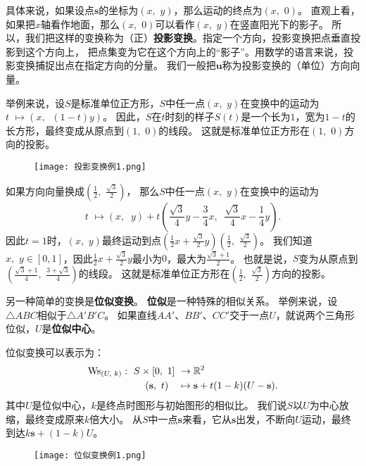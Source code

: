 \documentclass[12pt,UTF8]{ctexbook}
\begin{document}
具体来说，如果设点$\mathbf{s}$的坐标为$(x,\,\,y)$，那么运动的终点为$(x,\,\,0)$。
直观上看，如果把$x$轴看作地面，那么$(x,\,\,0)$可以看作$(x,\,\,y)$在竖直阳光下的影子。
所以，我们把这样的变换称为（正）\textbf{投影变换}。指定一个方向，投影变换把点垂直投影到这个方向上，
把点集变为它在这个方向上的“影子”。用数学的语言来说，投影变换捕捉出点在指定方向的分量。
我们一般把$\mathbf{u}$称为投影变换的（单位）方向向量。

举例来说，设$S$是标准单位正方形，$S$中任一点$(x,\,\,y)$在变换中的运动为$t\,\,\mapsto (x,\,\,\ (1 - t)y)$。
因此，$S$在$t$时刻的样子$S(t)$是一个长为$1$，宽为$1 - t$的长方形，最终变成从原点到$(1,\,\,0)$的线段。
这就是标准单位正方形在$(1,\,\,0)$方向的投影。

\begin{figure}[h] %
    \vspace{4pt}
    \centering
    \texttt{[image: 投影变换例1.png]}
\end{figure}

如果方向向量换成$(\frac{1}{2},\,\,\frac{\sqrt{3}}{2})$，
那么$S$中任一点$(x,\,\,y)$在变换中的运动为
$$t\,\,\mapsto (x,\,\,\ y) + t\left(\frac{\sqrt{3}}{4}y - \frac{3}{4}x,\,\,\ \frac{\sqrt{3}}{4}x - \frac{1}{4}y\right).$$
因此$t=1$时，$(x,\,\,y)$最终运动到点$\left(\frac{1}{2}x + \frac{\sqrt{3}}{2}y\right)(\frac{1}{2},\,\,\frac{\sqrt{3}}{2})$。
我们知道$x,\,\,y\in[0,1]$，因此$\frac{1}{2}x + \frac{\sqrt{3}}{2}y$最小为$0$，最大为$\frac{\sqrt{3}+1}{2}$。
也就是说，$S$变为从原点到$(\frac{\sqrt{3} + 1}{4},\,\,\frac{3 + \sqrt{3}}{4})$的线段。
这就是标准单位正方形在$(\frac{1}{2},\,\,\frac{\sqrt{3}}{2})$方向的投影。

另一种简单的变换是\textbf{位似变换}。
\textbf{位似}是一种特殊的相似关系。
举例来说，设$\triangle ABC$相似于$\triangle A'B'C$。
如果直线$AA'$、$BB'$、$CC'$交于一点$U$，就说两个三角形位似，$U$是\textbf{位似中心}。

位似变换可以表示为：
\begin{align}
    \mathrm{Ws}_{(U, \,\,k)}: \,\, S\times[0,\,\,1] \,\,&\rightarrow \mathbb{R}^2 \notag \\
    (\mathbf{s},\,\, t) \quad &\mapsto \mathbf{s} + t(1 - k)(U - \mathbf{s}). \notag
\end{align}
其中$U$是位似中心，$k$是终点时图形与初始图形的相似比。
我们说$S$以$U$为中心放缩，最终变成原来$k$倍大小。
从$S$中一点$\mathbf{s}$来看，它从$\mathbf{s}$出发，不断向$U$运动，最终到达$k\mathbf{s} + (1 - k)U$。

\begin{wrapfigure}[9]{r}{0.42\textwidth} %
    \vspace{-12pt}
    \flushright
    \texttt{[image: 位似变换例1.png]}
\end{wrapfigure}
\end{document}
